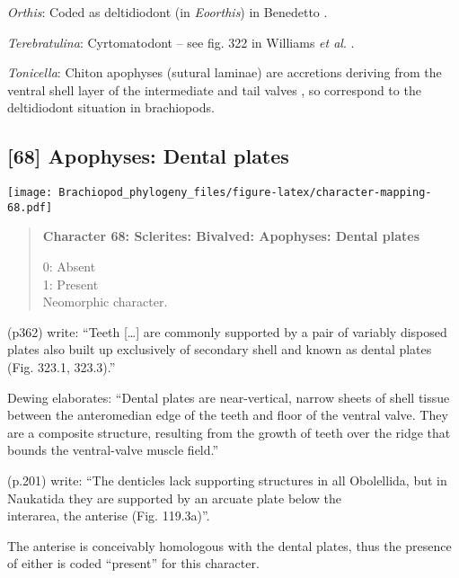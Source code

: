 \documentclass[openany]{book}
\theoremstyle{definition}
\theoremstyle{definition}
\theoremstyle{definition}
\theoremstyle{remark}
\begin{document}
\hypertarget{Orthis-coding-67}{}
\emph{Orthis}: Coded as deltidiodont (in \emph{Eoorthis}) in Benedetto
\citeyearpar{Benedetto2009iChaniella}.

\hypertarget{Terebratulina-coding-67}{}
\emph{Terebratulina}: Cyrtomatodont -- see fig. 322 in Williams \emph{et
al}. \citeyearpar{Williams2000LinguliformeaCraniiformea}.

\hypertarget{Tonicella-coding-67}{}
\emph{Tonicella}: Chiton apophyses (sutural laminae) are accretions
deriving from the ventral shell layer of the intermediate and tail
valves \citep{Schwabe2010}, so correspond to the deltidiodont situation
in brachiopods.

\subsection*{{[}68{]} Apophyses: Dental
plates}\label{apophyses-dental-plates}

\texttt{[image: Brachiopod\_phylogeny\_files/figure-latex/character-mapping-68.pdf]}

\begin{quote}
\textbf{Character 68: Sclerites: Bivalved: Apophyses: Dental plates}

0: Absent\\
1: Present\\
Neomorphic character.
\end{quote}

\citet{Williams1997Introduction} (p362) write: ``Teeth {[}\ldots{}{]}
are commonly supported by a pair of variably disposed plates also built
up exclusively of secondary shell and known as dental plates (Fig.
323.1, 323.3).''

Dewing \citeyearpar{Dewing2001Hingemodifications} elaborates: ``Dental
plates are near-vertical, narrow sheets of shell tissue between the
anteromedian edge of the teeth and floor of the ventral valve. They are
a composite structure, resulting from the growth of teeth over the ridge
that bounds the ventral-valve muscle field.''

\citet{Williams2000LinguliformeaCraniiformea} (p.201) write: ``The
denticles lack supporting structures in all Obolellida, but in Naukatida
they are supported by an arcuate plate below the\\
interarea, the anterise (Fig. 119.3a)''.

The anterise is conceivably homologous with the dental plates, thus the
presence of either is coded ``present'' for this character.
\end{document}
